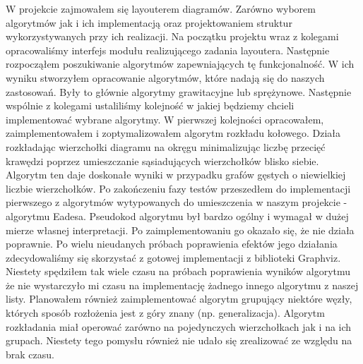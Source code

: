 W projekcie zajmowałem się layouterem diagramów. Zarówno wyborem algorytmów jak i ich implementacją oraz projektowaniem struktur wykorzystywanych przy ich realizacji.
Na początku projektu wraz z kolegami opracowaliśmy interfejs modułu realizującego zadania layoutera. Następnie rozpocząłem poszukiwanie algorytmów zapewniających tę funkcjonalność. W ich wyniku stworzyłem opracowanie algorytmów, które nadają się do naszych zastosowań. Były to głównie algorytmy grawitacyjne lub sprężynowe. Następnie wspólnie z kolegami ustaliliśmy kolejność w jakiej będziemy chcieli implementować wybrane algorytmy.
W pierwszej kolejności opracowałem, zaimplementowałem i zoptymalizowałem algorytm rozkładu kołowego. Działa rozkładając wierzchołki diagramu na okręgu minimalizując liczbę przecięć krawędzi poprzez umieszczanie sąsiadujących wierzchołków blisko siebie. Algorytm ten daje doskonałe wyniki w przypadku grafów gęstych o niewielkiej liczbie wierzchołków.
Po zakończeniu fazy testów przeszedłem do implementacji pierwszego z algorytmów wytypowanych do umieszczenia w naszym projekcie - algorytmu Eadesa. Pseudokod algorytmu był bardzo ogólny i wymagał w dużej mierze własnej interpretacji. Po zaimplementowaniu go okazało się, że nie działa poprawnie. Po wielu nieudanych próbach poprawienia efektów jego działania zdecydowaliśmy się skorzystać z gotowej implementacji z biblioteki Graphviz.
Niestety spędziłem tak wiele czasu na próbach poprawienia wyników algorytmu że nie wystarczyło mi czasu na implementację żadnego innego algorytmu z naszej listy.
Planowałem również zaimplementować algorytm grupujący niektóre węzły, których sposób rozłożenia jest z góry znany (np. generalizacja). Algorytm rozkładania miał operować zarówno na pojedynczych wierzchołkach jak i na ich grupach. Niestety tego pomysłu również nie udało się zrealizować ze względu na brak czasu.
